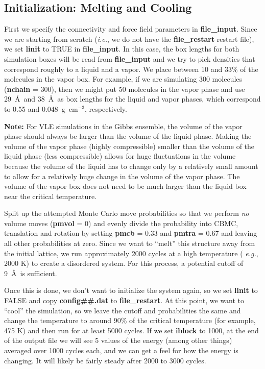 \documentclass[12pt,letterpaper]{article}
\begin{document}
\subsection{Initialization: Melting and Cooling}
First we specify the connectivity and force field parameters
in {\bf file\_input}. Since we are starting from scratch
({\it i.e.}, we do not have the {\bf file\_restart} restart
file), we set {\bf linit} to TRUE in {\bf file\_input}. In
this case, the box lengths for both simulation boxes will be
read from {\bf file\_input} and we try to pick densities
that correspond roughly to a liquid and a vapor. We place
between 10 and 33\% of the molecules in the vapor box. For
example, if we are simulating 300 molecules ({\bf nchain} =
300), then we might put 50 molecules in the vapor phase and
use 29~\AA~and 38~\AA~as box lengths for the liquid and
vapor phases, which correspond to 0.55 and
0.048~g~cm$^{-3}$, respectively.

{\bf Note:} For VLE simulations in the Gibbs ensemble, the
volume of the vapor phase should always be larger than the
volume of the liquid phase. Making the volume of the vapor
phase (highly compressible) smaller than the volume of the
liquid phase (less compressible) allows for huge
fluctuations in the volume because the volume of the liquid
has to change only by a relatively small amount to allow for
a relatively huge change in the volume of the vapor phase.
The volume of the vapor box does not need to be much
larger than the liquid box near the critical temperature.

Split up the attempted Monte Carlo move probabilities so
that we perform {\sl no} volume moves ({\bf pmvol} = 0) and
evenly divide the probability into CBMC, translation and
rotation by setting {\bf pmcb} = 0.33 and {\bf pmtra} = 0.67
and leaving all other probabilities at zero. Since we want
to ``melt'' this structure away from the initial lattice, we
run approximately 2000 cycles at a high temperature ({\it
  e.g.}, 2000 K) to create a disordered system. For this
process, a potential cutoff of 9~\AA~is sufficient.

\noindent Once this is done, we don't want to initialize the
system again, so we set {\bf linit} to FALSE and copy {\bf
  config\#\#.dat} to {\bf file\_restart}. At this point, we
want to ``cool'' the simulation, so we leave the cutoff and
probabilities the same and change the temperature to around
90\% of the critical temperature (for example, 475 K) and
then run for at least 5000 cycles. If we set {\bf iblock} to
1000, at the end of the output file we will see 5 values of
the energy (among other things) averaged over 1000 cycles
each, and we can get a feel for how the energy is changing.
It will likely be fairly steady after 2000 to 3000 cycles.
\end{document}
